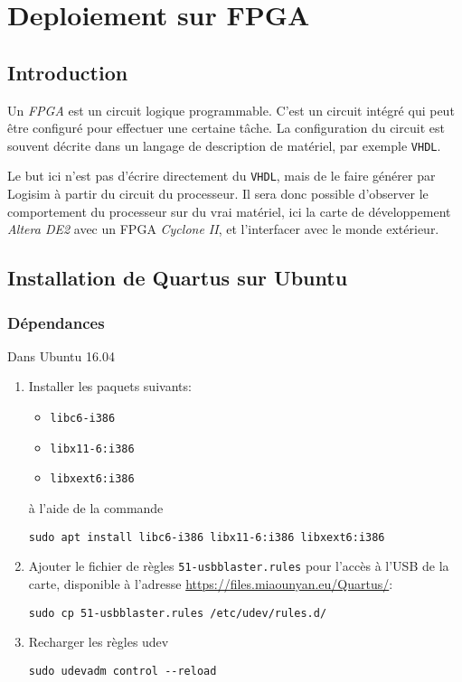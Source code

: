 \section{Deploiement sur FPGA}

\subsection{Introduction}

Un \textit{FPGA} est un circuit logique programmable. C'est un circuit intégré qui peut être configuré pour effectuer une certaine tâche. La configuration du circuit est souvent décrite dans un langage de description de matériel, par exemple \texttt{VHDL}.

Le but ici n'est pas d'écrire directement du \texttt{VHDL}, mais de le faire générer par Logisim à partir du circuit du processeur.
Il sera donc possible d'observer le comportement du processeur sur du vrai matériel, ici la carte de développement \textit{Altera DE2} avec un FPGA \textit{Cyclone II}, et l'interfacer avec le monde extérieur.

\subsection{Installation de Quartus sur Ubuntu}
\subsubsection{Dépendances}
\noindent Dans Ubuntu 16.04
\vspace{0.2em}
\begin{enumerate}
	\item Installer les paquets suivants:
	\begin{itemize}
		\item \texttt{libc6-i386}
		\item \texttt{libx11-6:i386}
		\item \texttt{libxext6:i386}
	\end{itemize}
	à l'aide de la commande
	\begin{lstlisting}
sudo apt install libc6-i386 libx11-6:i386 libxext6:i386
	\end{lstlisting}

	\item Ajouter le fichier de règles \texttt{51-usbblaster.rules} pour l'accès à l'USB de la carte, disponible à l'adresse \url{https://files.miaounyan.eu/Quartus/}:
	\begin{lstlisting}
sudo cp 51-usbblaster.rules /etc/udev/rules.d/
	\end{lstlisting}
	\item Recharger les règles udev
	\begin{lstlisting}
sudo udevadm control --reload
	\end{lstlisting}
\end{enumerate}

